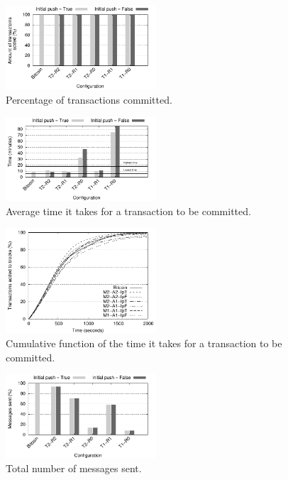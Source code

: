 \documentclass{dads}   %
\begin{document}
\begin{figure}
\centering
\includegraphics[width=0.5\textwidth]{plots/tx-added.pdf}
\caption{Percentage of transactions committed.}
\label{fig:tx-added}
\end{figure}

\begin{figure}
\centering
\includegraphics[width=0.5\textwidth]{plots/commit-time.pdf}
\caption{Average time it takes for a transaction to be committed.}
\label{fig:commit-time}
\end{figure}

\begin{figure}
\centering
\includegraphics[width=0.5\textwidth]{plots/cdf_commit.pdf}
\caption{Cumulative function of the time it takes for a transaction to be committed.}
\label{fig:cdf-commit}
\end{figure}

\begin{figure}
\centering
\includegraphics[width=0.5\textwidth]{plots/msg-sent.pdf}
\caption{Total number of messages sent.}
\label{fig:msg-sent}
\end{figure}
\end{document}
